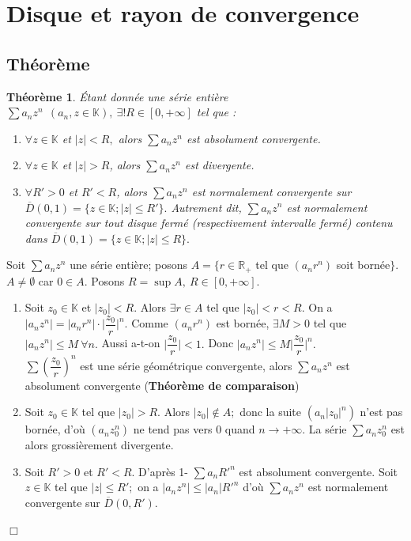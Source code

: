 \documentclass[11pt, a4paper]{book}
\newtheorem{teo}{Th\'eor\`eme}[section]
\newenvironment{pr}{\noindent {\bf Preuve} \noindent} {\hfill $\Box$\vskip 5mm}
\begin{document}
\section{Disque et rayon de convergence}
\subsection{Th\'eor\`eme}
\begin{teo} \label{teo5.2.1} \'Etant donn\'ee une s\'erie enti\`ere $\sum a_nz^n~~(a_n,z\in \mathbb{K}),~\exists !R\in [0,+\infty]$ tel que :
\begin{enumerate}
\item $\forall z\in \mathbb{K}$ et $|z|<R,$ alors $\sum a_n z^n$ est absolument convergente.
\item $\forall z\in \mathbb{K}$ et $|z|>R$, alors $\sum a_n z^n$ est divergente.
\item $\forall R'>0$ et $R'<R$, alors $\sum a_n z^n$ est normalement convergente sur $\overline{D}(0,1)=\{z\in \mathbb{K};|z|\leq R'\}.$ Autrement dit, $\sum a_nz^n$ est normalement convergente sur tout disque ferm\'e (respectivement intervalle ferm\'e) contenu dans $\overline{D}(0,1)=\{z\in \mathbb{K};|z|\leq R\}.$
\end{enumerate}
\end{teo}
\begin{pr}\quad
Soit $\sum a_n z^n$ une s\'erie enti\`ere; posons $A=\{r\in \mathbb{R}_+$ tel que $(a_nr^n)$ soit born\'ee$\}$. $A\neq \emptyset$ car $0\in A.$ Posons $R=\sup A, ~R\in [0,+\infty]$. 
\begin{enumerate}
\item Soit $z_0\in \mathbb{K}$ et $|z_0|<R.$ Alors $\exists r\in A$ tel que $|z_0|<r<R.$ On a $|a_nz^n|=|a_nr^n|\cdot\Big|\dfrac{z_0}{r}\Big|^n.$ Comme $(a_nr^n)$ est born\'ee, $\exists M>0$ tel que $|a_nz^n|\leq M~\forall n.$ Aussi a-t-on $\Big|\dfrac{z_0}{r}\Big|<1.$ Donc $|a_nz^n|\leq M\Big|\dfrac{z_0}{r}\Big|^n.$\\
$\sum \left(\dfrac{z_0}{r}\right)^n$ est une s\'erie g\'eom\'etrique convergente, alors $\sum a_nz^n$ est absolument convergente (\textbf{Th\'eor\`eme de comparaison})
\item Soit $z_0\in \mathbb{K}$ tel que $|z_0|>R.$ Alors $|z_0|\notin A;$ donc la suite $(a_n|z_0|^n)$ n'est pas born\'ee, d'o\`u $(a_nz_0^n)$ ne tend pas vers $0$ quand $n\rightarrow+\infty.$ La s\'erie $\sum a_n z_0^n$ est alors grossi\`erement divergente.
\item Soit $R'>0$ et $R'<R$. D'apr\`es 1- $\sum a_nR'^n$ est absolument convergente. Soit $z\in \mathbb{K}$ tel que $|z|\leq R';$ on a $|a_nz^n|\leq |a_n|R'^n$ d'o\`u $\sum a_n z^n$ est normalement convergente sur $\overline{D}(0,R').$
\end{enumerate}
\end{pr}
\end{document}
